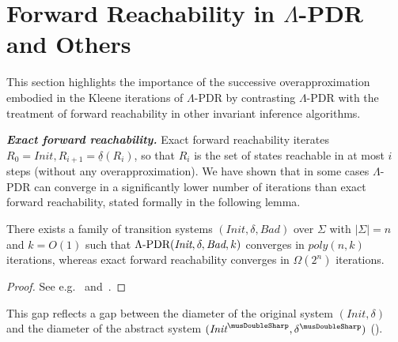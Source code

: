 \documentclass[acmsmall,screen]{acmart}
\newcommand{\para}[1]{\vspace{2pt}\noindent\textbf{\textit{#1.}}}
\newcommand{\card}[1]{{\left\vert{#1}\right\vert}} %
\newcommand{\vocabulary}{\Sigma}
\newcommand{\voc}{\vocabulary}
\newcommand{\Init}{{\textit{Init}}}
\newcommand{\Bad}{\textit{Bad}}
\newcommand{\tr}{\delta}
\newcommand{\reflextr}[1]{\underline{#1}}
\newcommand{\postimage}[2]{{\reflextr{#1}}({#2})}
\newcommand{\bigO}{O}
\newcommand{\absr}[1]{{#1}^{\musDoubleSharp}}
\newcommand{\eepdr}{\Lambda\mbox{\rm-PDR}}
\begin{document}
%
%
%
%
%
%
%

%
%
%
%
%
%
%
%
%
%
%
%
%
%
%
%
%
%
%
%
%
%
%
%
%
%
%
%
%
%
%
%
%
%
%
%
%
%
%
%
%
%
%
%
%
%
%
%
%
%
%
%
%
%
%
%
%
%
%
%
%
%
%
%
%
%
%
%
%
%
%
%
%
%
%
%
%
%
%
%
%
%
%
%
%
%
%
%
%
%
%
%
%
%
%
%
%
%
%
%
%
%
%
%
%
%
%
%
%
%
%
%
%
%
%
%
%
%
%
%
%
%
%
%
%
%
%
%
%
%
%
%
%
%
%
%
%
%
%
%
%
%
%
%
%
%
%
%
%
%
%
%
%
%
%
%
%
%
%
%
%
%
%
%
%
%
%
%
%
%
%
%
%
%
%
%
%
%
%
%
%
%
%
%

%
%

%
%
%
%
%
%
%
%
%
%

%
%
%

%
%
%
%
%

%
%
%

%
%
%
%
%
%
%

%
%
%
%
%
%
%
%

%
%
%

%
%
%
%
%
%
%
%
%

%

%

%

%
%
%

%
%
%
%
%
%
%
%
%
%
%
%
%

%
%
%
%
%
%
%
%
%
%

%
%
%
%
%
%
%
%

%
%
%
%
%

%
%
%
 
%
\section{Forward Reachability in $\Lambda$-PDR and Others}
\label{sec:itp-friends}
This section highlights the importance of the successive overapproximation embodied in the Kleene iterations of $\Lambda$-PDR by contrasting $\Lambda$-PDR with the treatment of forward reachability in other invariant inference algorithms.

\para{Exact forward reachability}
Exact forward reachability iterates $R_0=\Init, R_{i+1}=\postimage{\tr}{R_i}$, so that $R_i$ is the set of states reachable in at most $i$ steps (without any overapproximation).
We have shown that in some cases $\Lambda$-PDR can converge in a significantly lower number of iterations than exact forward reachability, stated formally in the following lemma.
\begin{lemma}
There exists a family of transition systems $(\Init,\tr,\Bad)$ over $\voc$ with $\card{\voc}=n$ and $k=\bigO(1)$ such that $\eepdr(\Init,\tr,\Bad,k)$ converges in $\textit{poly}(n,k)$ iterations, whereas exact forward reachability converges in $\Omega(2^n)$ iterations.
\end{lemma}
\begin{proof}
See e.g.~ and~. %
\end{proof}
This gap reflects a gap between the diameter of the original system $(\Init,\tr)$ and the diameter of the abstract system $(\absr{\Init},\absr{\tr})$ ().
\end{document}
